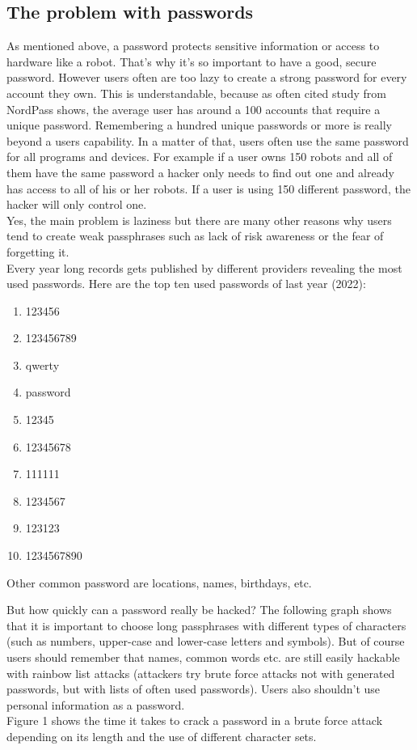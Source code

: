 \documentclass[conference]{IEEEtran}
\begin{document}
\subsection{The problem with passwords} 
As mentioned above, a password protects sensitive information or access to hardware like a robot. That's why it's so important to have a good, secure password. However users often are too lazy to create a strong password for every account they own. This is understandable, because as often cited study from NordPass shows, the average user has around a 100 accounts that require a unique password. Remembering a hundred unique passwords or more is really beyond a users capability. In a matter of that, users often use the same password for all programs and devices. For example if a user owns 150 robots and all of them have the same password a hacker only needs to find out one and already has access to all of his or her robots. If a user is using 150 different password, the hacker will only control one.\cite{b1} \cite{b2}\\
Yes, the main problem is laziness but there are many other reasons why users tend to create weak passphrases such as lack of risk awareness or the fear of forgetting it.\\
Every year long records gets published by different providers revealing the most used passwords. Here are the top ten used passwords of last year (2022): \cite{b3}
\begin{enumerate}
\item 123456
\item 123456789
\item qwerty
\item password
\item 12345
\item 12345678
\item 111111
\item 1234567
\item 123123
\item 1234567890
\end{enumerate}
Other common password are locations, names, birthdays, etc.

But how quickly can a password really be hacked? The following graph shows that it is important to choose long passphrases with different types of characters (such as numbers, upper-case and lower-case letters and symbols). But of course users should remember that names, common words etc. are still easily hackable with rainbow list attacks (attackers try brute force attacks not with generated passwords, but with lists of often used passwords). Users also shouldn't use personal information as a password.\\
Figure 1 shows the time it takes to crack a password in a brute force attack depending on its length and the use of different character sets.
\end{document}
